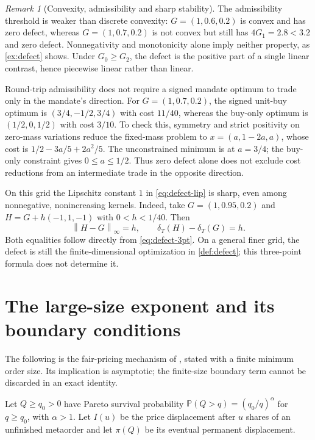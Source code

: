 \documentclass[11pt]{article}
\newcommand{\norm}[1]{\left\lVert #1\right\rVert}
\numberwithin{equation}{section}
\theoremstyle{definition}
\theoremstyle{remark}
\newtheorem{remark}[theorem]{Remark}
\theoremstyle{definition}
\newcommand{\Pp}{\mathbb P}
\begin{document}
\begin{remark}[Convexity, admissibility and sharp stability]\label{rem:defect-3pt}
The admissibility threshold is weaker than discrete convexity:
$G=(1,0.6,0.2)$ is convex and has zero defect, whereas
$G=(1,0.7,0.2)$ is not convex but still has $4G_1=2.8<3.2$ and zero defect.
Nonnegativity and monotonicity alone imply neither property, as
\cref{ex:defect} shows. Under $G_0\geq G_2$, the defect is the positive part
of a single linear contrast, hence piecewise linear rather than linear.

Round-trip admissibility does not require a signed mandate optimum to trade
only in the mandate's direction. For $G=(1,0.7,0.2)$, the signed unit-buy
optimum is $(3/4,-1/2,3/4)$ with cost $11/40$, whereas the buy-only optimum
is $(1/2,0,1/2)$ with cost $3/10$. To check this, symmetry and strict
positivity on zero-mass variations reduce the fixed-mass problem to
$x=(a,1-2a,a)$, whose cost is $1/2-3a/5+2a^2/5$. The unconstrained
minimum is at $a=3/4$; the buy-only constraint gives $0\leq a\leq1/2$.
Thus zero defect alone does not exclude cost reductions from an intermediate
trade in the opposite direction.

On this grid the Lipschitz constant $1$ in \eqref{eq:defect-lip} is sharp,
even among nonnegative, nonincreasing kernels. Indeed, take
$G=(1,0.95,0.2)$ and $H=G+h(-1,1,-1)$ with $0<h<1/40$. Then
\[
 \norm{H-G}_\infty=h,\qquad \delta_T(H)-\delta_T(G)=h.
\]
Both equalities follow directly from \eqref{eq:defect-3pt}. On a general
finer grid, the defect is still the finite-dimensional optimization in
\cref{def:defect}; this three-point formula does not determine it.
\end{remark}

\section{The large-size exponent and its boundary conditions}\label{sec:universality}

The following is the fair-pricing mechanism of \citet{farmer2013}, stated
with a finite minimum order size. Its implication is asymptotic; the
finite-size boundary term cannot be discarded in an exact identity.

Let $Q\ge q_0>0$ have Pareto survival probability
$\Pp(Q>q)=(q_0/q)^\alpha$ for $q\ge q_0$, with $\alpha>1$.
Let $I(u)$ be the price displacement after $u$ shares of an unfinished
metaorder and let $\pi(Q)$ be its eventual permanent displacement.
\end{document}
